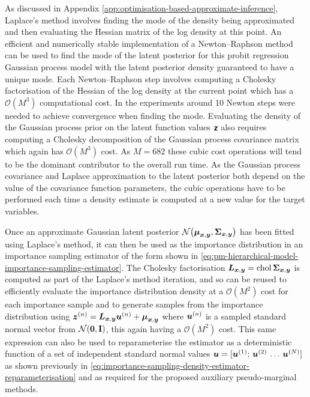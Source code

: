 As discussed in Appendix \ref{app:optimisation-based-approximate-inference}, Laplace's method involves finding the mode of the density being approximated and then evaluating the Hessian matrix of the log density at this point. An efficient and numerically stable implementation of a Newton--Raphson method can be used to find the mode of the latent posterior for this probit regression Gaussian process model \citep[\S 3.4]{rasmussen2006gaussian} with the latent posterior density guaranteed to have a unique mode. Each Newton--Raphson step involves computing a Cholesky factorisation of the Hessian of the log density at the current point which has a $\mathcal{O}(M^3)$ computational cost. In the experiments around 10 Newton steps were needed to achieve convergence when finding the mode. Evaluating the density of the Gaussian process prior on the latent function values $\boldsymbol{\mathsf{z}}$ also requires computing a Cholesky decomposition of the Gaussian process covariance matrix which again has $\mathcal{O}(M^3)$ cost. As $M=682$ these cubic cost operations will tend to be the dominant contributor to the overall run time. As the Gaussian process covariance and Laplace approximation to the latent posterior both depend on the value of the covariance function parameters, the cubic operations have to be performed each time a density estimate is computed at a new value for the target variables.

Once an approximate Gaussian latent posterior $\nrm{\vct{\mu}_{\vct{x},\vct{y}},\mtx{\Sigma}_{\vct{x},\vct{y}}}$ has been fitted using Laplace's method, it can then be used as the importance distribution in an importance sampling estimator of the form shown in \eqref{eq:pm-hierarchical-model-importance-sampling-estimator}. The Cholesky factorisation $\boldsymbol{L}_{\boldsymbol{x},\boldsymbol{y}}= \operatorname{chol}\boldsymbol{\Sigma}_{\boldsymbol{x},\boldsymbol{y}}$ is computed as part of the Laplace's method iteration, and so can be reused to efficiently evaluate the importance distribution density at a $\mathcal{O}(M^2)$ cost for each importance sample and to generate samples from the importance distribution using $\boldsymbol{z}^{(n)} = \boldsymbol{L}_{\boldsymbol{x},\boldsymbol{y}}\boldsymbol{u}^{(n)} + \boldsymbol{\mu}_{\boldsymbol{x},\boldsymbol{y}}$ where $\boldsymbol{u}^{(n)}$ is a sampled standard normal vector from $\nrm{\vct{0},\mathbf{I}}$, this again having a $\mathcal{O}(M^2)$ cost. This same expression can also be used to reparameterise the estimator as a deterministic function of a set of independent standard normal values $\boldsymbol{u} = [\boldsymbol{u}^{(1)};\,\boldsymbol{u}^{(2)}\,\dots\,\boldsymbol{u}^{(N)}]$ as shown previously in \eqref{eq:importance-sampling-density-estimator-reparameterisation} and as required for the proposed auxiliary pseudo-marginal methods.

